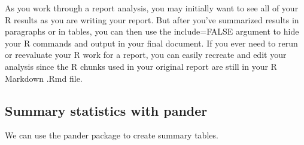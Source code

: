 \documentclass[
]{book}
\newenvironment{Shaded}{\begin{snugshade}}{\end{snugshade}}
\newcommand{\AttributeTok}[1]{\textcolor[rgb]{0.77,0.63,0.00}{#1}}
\newcommand{\CommentTok}[1]{\textcolor[rgb]{0.56,0.35,0.01}{\textit{#1}}}
\newcommand{\FunctionTok}[1]{\textcolor[rgb]{0.00,0.00,0.00}{#1}}
\newcommand{\NormalTok}[1]{#1}
\newcommand{\SpecialCharTok}[1]{\textcolor[rgb]{0.00,0.00,0.00}{#1}}
\newcommand{\StringTok}[1]{\textcolor[rgb]{0.31,0.60,0.02}{#1}}
\begin{document}
As you work through a report analysis, you may initially want to see all of your R results as you are writing your report. But after you've summarized results in paragraphs or in tables, you can then use the include=FALSE argument to hide your R commands and output in your final document. If you ever need to rerun or reevaluate your R work for a report, you can easily recreate and edit your analysis since the R chunks used in your original report are still in your R Markdown .Rmd file.

\hypertarget{summary-statistics-with-pander}{%
\subsection{Summary statistics with pander}\label{summary-statistics-with-pander}}

We can use the pander package to create summary tables.

\begin{Shaded}
\end{Shaded}
\end{document}
